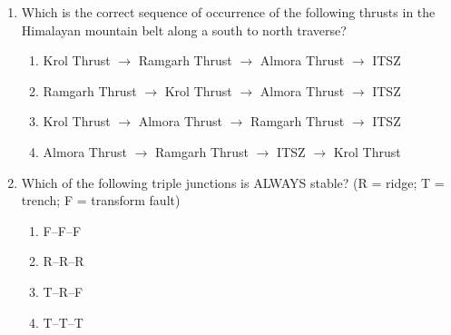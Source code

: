 \documentclass[journal,12pt,onecolumn]{IEEEtran}
\theoremstyle{remark}
\begin{document}
\begin{enumerate}[resume]
\begin{minipage}[t]{0.45\textwidth}
2. Southern Granulite Terrain  

3. Western Dharwar Craton  

4. Aravalli--Delhi Fold Belt  

5. Singhbhum Craton  

6. Bhandara Craton  
\end{minipage}

\vspace{0.3cm}

\begin{multicols}{2}
\begin{enumerate}
\item P--1, Q--2, R--5, S--4  
\item P--6, Q--5, R--2, S--4  
\item P--4, Q--2, R--6, S--1  
\item P--2, Q--4, R--1, S--3  
\end{enumerate}
\end{multicols}
\vspace{0.5cm}

\item Which is the correct sequence of occurrence of the following thrusts in the Himalayan mountain belt along a south to north traverse?
\begin{enumerate}
\item Krol Thrust $\rightarrow$ Ramgarh Thrust $\rightarrow$ Almora Thrust $\rightarrow$ ITSZ  
\item Ramgarh Thrust $\rightarrow$ Krol Thrust $\rightarrow$ Almora Thrust $\rightarrow$ ITSZ  
\item Krol Thrust $\rightarrow$ Almora Thrust $\rightarrow$ Ramgarh Thrust $\rightarrow$ ITSZ  
\item Almora Thrust $\rightarrow$ Ramgarh Thrust $\rightarrow$ ITSZ $\rightarrow$ Krol Thrust  
\vspace{0.5cm}
\end{enumerate}

\item Which of the following triple junctions is ALWAYS stable? (R = ridge; T = trench; F = transform fault)

\begin{multicols}{4}
\begin{enumerate}
\item F--F--F  
\item R--R--R  
\item T--R--F  
\item T--T--T  
\end{enumerate}
\end{multicols}
\vspace{0.5cm}



\end{enumerate}
\end{document}
